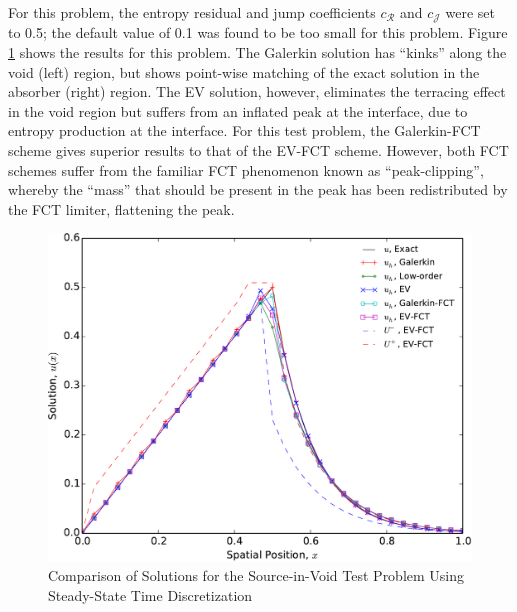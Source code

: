 For this problem, the entropy residual and jump coefficients $c_\mathcal{R}$
and $c_\mathcal{J}$ were set to 0.5; the default value of 0.1 was found
to be too small for this problem.
Figure \ref{fig:source_in_void} shows the results for this problem.
The Galerkin solution has ``kinks'' along the void (left) region, but
shows point-wise matching of the exact solution in the absorber (right)
region. The EV solution, however, eliminates the terracing effect in
the void region but suffers from an inflated peak at the interface, due
to entropy production at the interface. For this test problem, the
Galerkin-FCT scheme gives superior results to that of the EV-FCT
scheme. However, both FCT schemes suffer from the familiar FCT
phenomenon known as ``peak-clipping'', whereby the ``mass'' that
should be present in the peak has been redistributed by the FCT
limiter, flattening the peak.

\begin{figure}[htb]
   \centering
      \includegraphics[width=\textwidth]
        {images/solution_source_in_void.pdf}
      \caption{Comparison of Solutions for the Source-in-Void Test
       Problem Using Steady-State Time Discretization}
   \label{fig:source_in_void}
\end{figure}
\clearpage
